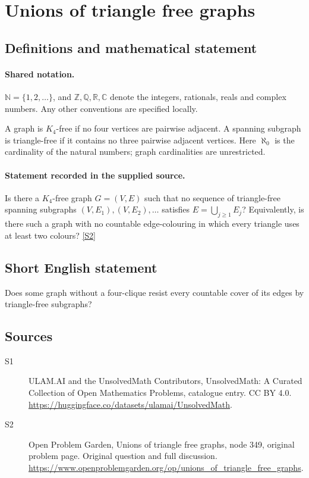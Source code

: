\documentclass[11pt]{article}
\newcommand{\sref}[2]{\hyperlink{source:#1:#2}{[S#2]}}
\begin{document}
\section{Unions of triangle free graphs}\label{statement}

\subsection{Definitions and mathematical statement}

\paragraph{Shared notation.}$\mathbb N=\{1,2,\ldots\}$, and $\mathbb Z,\mathbb Q,\mathbb R,\mathbb C$ denote the integers, rationals, reals and complex numbers. Any other conventions are specified locally.


A graph is $K_4$-free if no four vertices are pairwise adjacent. A spanning subgraph is triangle-free if it contains no three pairwise adjacent vertices. Here $\aleph_0$ is the cardinality of the natural numbers; graph cardinalities are unrestricted.
\paragraph{Statement recorded in the supplied source.}
Is there a $K_4$-free graph $G=(V,E)$ such that no sequence of triangle-free spanning subgraphs $(V,E_1),(V,E_2),\ldots$ satisfies $E=\bigcup_{j\geq1}E_j$? Equivalently, is there such a graph with no countable edge-colouring in which every triangle uses at least two colours? \sref{statement}{2}
\subsection{Short English statement}
Does some graph without a four-clique resist every countable cover of its edges by triangle-free subgraphs?
\subsection{Sources}
\begin{description}
\item[\hypertarget{source:statement:1}{S1}] ULAM.AI and the UnsolvedMath Contributors, UnsolvedMath: A Curated Collection of Open Mathematics Problems, catalogue entry. CC BY 4.0. \url{https://huggingface.co/datasets/ulamai/UnsolvedMath}.
\item[\hypertarget{source:statement:2}{S2}] Open Problem Garden, Unions of triangle free graphs, node 349, original problem page. Original question and full discussion. \url{https://www.openproblemgarden.org/op/unions_of_triangle_free_graphs}.

\end{description}
\label{end:statement}
\end{document}
